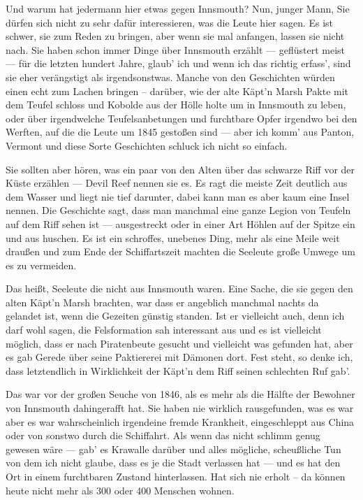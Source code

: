 Und warum hat jedermann hier etwas gegen Innsmouth? Nun, junger Mann, Sie dürfen sich nicht zu sehr dafür interessieren, was die Leute hier sagen. Es ist schwer, sie zum Reden zu bringen, aber wenn sie mal anfangen, lassen sie nicht nach. Sie haben schon immer Dinge über Innsmouth erzählt --- geflüstert meist --- für die letzten hundert Jahre, glaub' ich und wenn ich das richtig erfass', sind sie eher verängstigt als irgendsonstwas. Manche von den Geschichten würden einen echt zum Lachen bringen -- darüber, wie der alte Käpt'n Marsh Pakte mit dem Teufel schloss und Kobolde aus der Hölle holte um in Innsmouth zu leben, oder über irgendwelche Teufelsanbetungen und furchtbare Opfer irgendwo bei den Werften, auf die die Leute um 1845 gestoßen sind --- aber ich komm' aus Panton, Vermont und diese Sorte Geschichten schluck ich nicht so einfach.

Sie sollten aber hören, was ein paar von den Alten über das schwarze Riff vor der Küste erzählen --- Devil Reef nennen sie es. Es ragt die meiste Zeit deutlich aus dem Wasser und liegt nie tief darunter, dabei kann man es aber kaum eine Insel nennen. Die Geschichte sagt, dass man manchmal eine ganze Legion von Teufeln auf dem Riff sehen ist --- ausgestreckt oder in einer Art Höhlen auf der Spitze ein und aus huschen. Es ist ein schroffes, unebenes Ding, mehr als eine Meile weit draußen und zum Ende der Schiffartszeit machten die Seeleute große Umwege um es zu vermeiden.

Das heißt, Seeleute die nicht aus Innsmouth waren. Eine Sache, die sie gegen den alten Käpt'n Marsh brachten, war dass er angeblich manchmal nachts da gelandet ist, wenn die Gezeiten günstig standen. Ist er vielleicht auch, denn ich darf wohl sagen, die Felsformation sah interessant aus und es ist vielleicht möglich, dass er nach Piratenbeute gesucht und vielleicht was gefunden hat, aber es gab Gerede über seine Paktiererei mit Dämonen dort. Fest steht, so denke ich, dass letztendlich in Wirklichkeit der Käpt'n dem Riff seinen schlechten Ruf gab'.

Das war vor der großen Seuche von 1846, als es mehr als die Hälfte der Bewohner von Innsmouth dahingerafft hat. Sie haben nie wirklich rausgefunden, was es war aber es war wahrscheinlich irgendeine fremde Krankheit, eingeschleppt aus China oder von sonstwo durch die Schiffahrt. Als wenn das nicht schlimm genug gewesen wäre --- gab' es Krawalle darüber und alles mögliche, scheußliche Tun von dem ich nicht glaube, dass es je die Stadt verlassen hat --- und es hat den Ort in einem furchtbaren Zustand hinterlassen. Hat sich nie erholt -- da können heute nicht mehr als 300 oder 400 Menschen wohnen.

